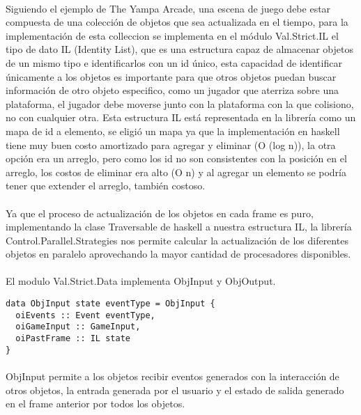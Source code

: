 \documentclass{standalone}
\begin{document}
\paragraph{}
Siguiendo el ejemplo de The Yampa Arcade, una escena de juego debe estar compuesta de una colección de objetos que sea actualizada en el tiempo, para la implementación de esta colleccion se implementa en el módulo Val.Strict.IL el tipo de dato IL (Identity List), que es una estructura capaz de almacenar objetos de un mismo tipo e identificarlos con un id único, esta capacidad de identificar únicamente a los objetos es importante para que otros objetos puedan buscar información de otro objeto especifico, como un jugador que aterriza sobre una plataforma, el jugador debe moverse junto con la plataforma con la que colisiono, no con cualquier otra. Esta estructura IL está representada en la librería como un mapa de id a elemento, se eligió un mapa ya que la implementación en haskell tiene muy buen costo amortizado para agregar y eliminar (O (log n)), la otra opción era un arreglo, pero como los id no son consistentes con la posición en el arreglo, los costos de eliminar era alto (O n) y al agregar un elemento se podría tener que extender el arreglo, también costoso.

\paragraph{}
Ya que el proceso de actualización de los objetos en cada frame es puro, implementando la clase Traversable de haskell a nuestra estructura IL, la librería Control.Parallel.Strategies nos permite calcular la actualización de los diferentes objetos en paralelo aprovechando la mayor cantidad de procesadores disponibles.

\paragraph{}
El modulo Val.Strict.Data implementa ObjInput y ObjOutput.

\begin{lstlisting}
data ObjInput state eventType = ObjInput {
  oiEvents :: Event eventType,
  oiGameInput :: GameInput,
  oiPastFrame :: IL state
}
\end{lstlisting}

\paragraph{}
ObjInput permite a los objetos recibir eventos generados con la interacción de otros objetos, la entrada generada por el usuario y el estado de salida generado en el frame anterior por todos los objetos.
\end{document}
